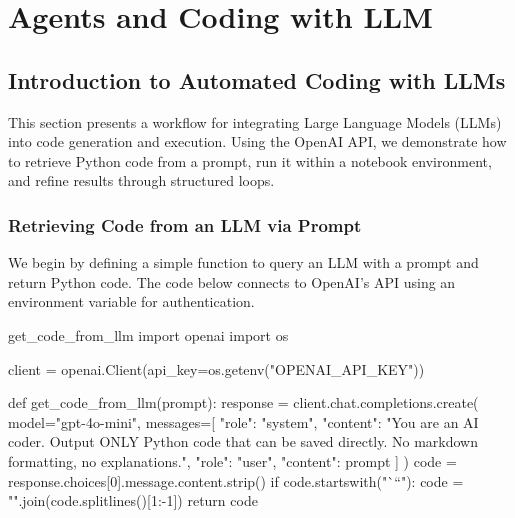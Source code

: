 \chapter{Agents and Coding with LLM}

%
\section{Introduction to Automated Coding with LLMs}

This section presents a workflow for integrating Large Language Models (LLMs) into code generation and execution. Using the OpenAI API, we demonstrate how to retrieve Python code from a prompt, run it within a notebook environment, and refine results through structured loops.

%
\subsection*{Retrieving Code from an LLM via Prompt}

We begin by defining a simple function to query an LLM with a prompt and return Python code. The code below connects to OpenAI’s API using an environment variable for authentication.

\begin{codeonly}{get\_code\_from\_llm}
import openai
import os

client = openai.Client(api_key=os.getenv("OPENAI_API_KEY"))

def get_code_from_llm(prompt):
    response = client.chat.completions.create(
        model="gpt-4o-mini",
        messages=[
            {"role": "system", "content": "You are an AI coder. Output ONLY Python code that can be saved directly. No markdown formatting, no explanations."},
            {"role": "user", "content": prompt}
        ]
    )
    code = response.choices[0].message.content.strip()
    if code.startswith("```"):
        code = "\n".join(code.splitlines()[1:-1])
    return code
\end{codeonly}

%
